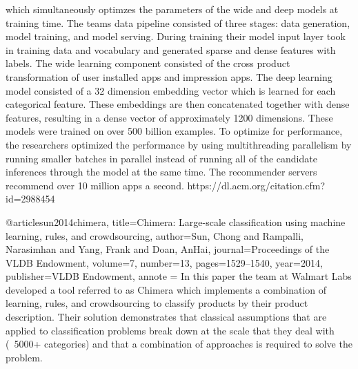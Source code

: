 {{  which simultaneously optimzes the parameters of the wide and deep models at training time. The teams data pipeline consisted of three stages: data generation, 
  model training, and model serving. During training their model input layer took in training data and vocabulary and generated sparse and dense features with labels.
  The wide learning component consisted of the cross product transformation of user installed apps and impression apps. The deep learning model consisted of a 32 dimension
  embedding vector which is learned for each categorical feature. These embeddings are then concatenated together with dense features, resulting in a dense vector of
  approximately 1200 dimensions. These models were trained on over 500 billion examples. To optimize for performance, the researchers optimized the performance by using multithreading
  parallelism by running smaller batches in parallel instead of running all of the candidate inferences through the model at the same time. The recommender servers recommend over 10 million
  apps a second.
  https://dl.acm.org/citation.cfm?id=2988454
  }
}

@article{sun2014chimera,
  title={Chimera: Large-scale classification using machine learning, rules, and crowdsourcing},
  author={Sun, Chong and Rampalli, Narasimhan and Yang, Frank and Doan, AnHai},
  journal={Proceedings of the VLDB Endowment},
  volume={7},
  number={13},
  pages={1529--1540},
  year={2014},
  publisher={VLDB Endowment},
  annote = {
    In this paper the team at Walmart Labs developed a tool referred to as Chimera which implements a combination of learning, rules, and crowdsourcing to classify products by their
    product description. Their solution demonstrates that classical assumptions that are applied to classification problems break down at the scale that they deal with (~5000+ categories)
    and that a combination of approaches is required to solve the problem.
  }
}

